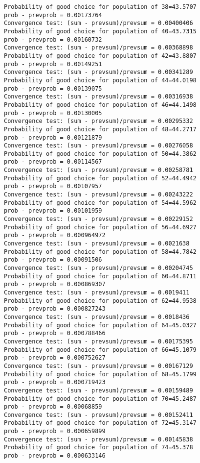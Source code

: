 \documentclass[11pt,onecolumn]{article}
\begin{document}
\begin{verbatim}
Probability of good choice for population of 38=43.5707
prob - prevprob = 0.00173764
Convergence test: (sum - prevsum)/prevsum = 0.00400406
Probability of good choice for population of 40=43.7315
prob - prevprob = 0.00160732
Convergence test: (sum - prevsum)/prevsum = 0.00368898
Probability of good choice for population of 42=43.8807
prob - prevprob = 0.00149251
Convergence test: (sum - prevsum)/prevsum = 0.00341289
Probability of good choice for population of 44=44.0198
prob - prevprob = 0.00139075
Convergence test: (sum - prevsum)/prevsum = 0.00316938
Probability of good choice for population of 46=44.1498
prob - prevprob = 0.00130005
Convergence test: (sum - prevsum)/prevsum = 0.00295332
Probability of good choice for population of 48=44.2717
prob - prevprob = 0.00121879
Convergence test: (sum - prevsum)/prevsum = 0.00276058
Probability of good choice for population of 50=44.3862
prob - prevprob = 0.00114567
Convergence test: (sum - prevsum)/prevsum = 0.00258781
Probability of good choice for population of 52=44.4942
prob - prevprob = 0.00107957
Convergence test: (sum - prevsum)/prevsum = 0.00243222
Probability of good choice for population of 54=44.5962
prob - prevprob = 0.00101959
Convergence test: (sum - prevsum)/prevsum = 0.00229152
Probability of good choice for population of 56=44.6927
prob - prevprob = 0.000964972
Convergence test: (sum - prevsum)/prevsum = 0.0021638
Probability of good choice for population of 58=44.7842
prob - prevprob = 0.00091506
Convergence test: (sum - prevsum)/prevsum = 0.00204745
Probability of good choice for population of 60=44.8711
prob - prevprob = 0.000869307
Convergence test: (sum - prevsum)/prevsum = 0.0019411
Probability of good choice for population of 62=44.9538
prob - prevprob = 0.000827243
Convergence test: (sum - prevsum)/prevsum = 0.0018436
Probability of good choice for population of 64=45.0327
prob - prevprob = 0.000788466
Convergence test: (sum - prevsum)/prevsum = 0.00175395
Probability of good choice for population of 66=45.1079
prob - prevprob = 0.000752627
Convergence test: (sum - prevsum)/prevsum = 0.00167129
Probability of good choice for population of 68=45.1799
prob - prevprob = 0.000719423
Convergence test: (sum - prevsum)/prevsum = 0.00159489
Probability of good choice for population of 70=45.2487
prob - prevprob = 0.00068859
Convergence test: (sum - prevsum)/prevsum = 0.00152411
Probability of good choice for population of 72=45.3147
prob - prevprob = 0.000659899
Convergence test: (sum - prevsum)/prevsum = 0.00145838
Probability of good choice for population of 74=45.378
prob - prevprob = 0.000633146

\end{verbatim}
\end{document}

